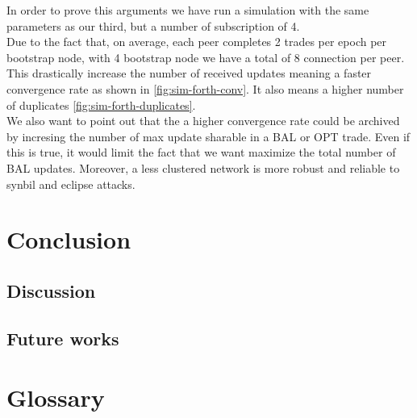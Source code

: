 \documentclass[mscthesis]{usiinfthesis}
\begin{document}
In order to prove this arguments we have run a simulation with the same parameters as our third, but a number of subscription of 4. \\
Due to the fact that, on average, each peer completes 2 trades per epoch per bootstrap node, with 4 bootstrap node we have a total of 8 connection per peer. This drastically increase the number of received updates meaning a faster convergence rate as shown in \ref{fig:sim-forth-conv}. It also means a higher number of duplicates \ref{fig:sim-forth-duplicates}. \\
We also want to point out that the a higher convergence rate could be archived by incresing the number of max update sharable in a BAL or OPT trade. Even if this is true, it would limit the fact that we want maximize the total number of BAL updates. Moreover, a less clustered network is more robust and reliable to synbil and eclipse attacks. 

\chapter{Conclusion}
\section{Discussion}
\section{Future works}

\chapter{Glossary}




\lipsum
\end{document}
